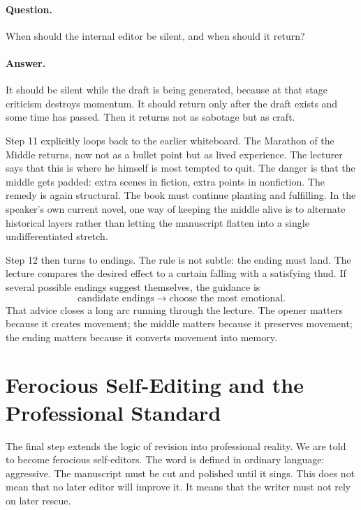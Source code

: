 \paragraph{Question.} When should the internal editor be silent, and when should it return?

\paragraph{Answer.} It should be silent while the draft is being generated, because at that stage criticism destroys momentum. It should return only after the draft exists and some time has passed. Then it returns not as sabotage but as craft.

Step 11 explicitly loops back to the earlier whiteboard. The Marathon of the Middle returns, now not as a bullet point but as lived experience. The lecturer says that this is where he himself is most tempted to quit. The danger is that the middle gets padded: extra scenes in fiction, extra points in nonfiction. The remedy is again structural. The book must continue planting and fulfilling. In the speaker's own current novel, one way of keeping the middle alive is to alternate historical layers rather than letting the manuscript flatten into a single undifferentiated stretch.

Step 12 then turns to endings. The rule is not subtle: the ending must land. The lecture compares the desired effect to a curtain falling with a satisfying thud. If several possible endings suggest themselves, the guidance is
\begin{equation}
\text{candidate endings} \to \text{choose the most emotional}.
\end{equation}
That advice closes a long arc running through the lecture. The opener matters because it creates movement; the middle matters because it preserves movement; the ending matters because it converts movement into memory.

\section{Ferocious Self-Editing and the Professional Standard}

The final step extends the logic of revision into professional reality. We are told to become ferocious self-editors. The word is defined in ordinary language: aggressive. The manuscript must be cut and polished until it sings. This does not mean that no later editor will improve it. It means that the writer must not rely on later rescue.

